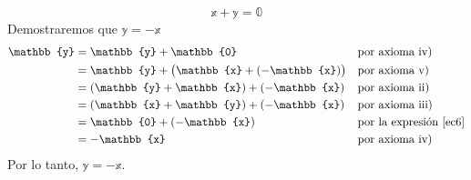 \begin{theorem}{}{}
\begin{equation}
        \mathbb{x} + \mathbb{y} = \mathbb{0} \label{ec6}
    \end{equation}
    Demostraremos que $\mathbb{y} = -\mathbb{x}$
    \begin{align*}
        \mathbb{y} & = \mathbb{y} + \mathbb{0} && \text{por axioma iv)} \\
        & = \mathbb{y} + \big( \mathbb{x} + (-\mathbb{x}) \big) && \text{por axioma v)} \\
        & = (\mathbb{y} + \mathbb{x}) + (-\mathbb{x}) && \text{por axioma ii)} \\
        & = (\mathbb{x} + \mathbb{y}) + (-\mathbb{x}) && \text{por axioma iii)} \\
        & = \mathbb{0} + (-\mathbb{x}) && \text{por la expresión \eqref{ec6}} \\
        & = -\mathbb{x} && \text{por axioma iv)}
    \end{align*}
    Por lo tanto, $\mathbb{y} = -\mathbb{x}$.
\end{theorem}

\newpage

